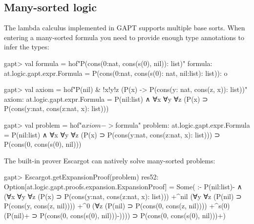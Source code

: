 \documentclass[a4paper,11pt]{article}
\begin{document}
\subsection{Many-sorted logic}\label{sec:many_sorted}

The lambda calculus implemented in GAPT supports multiple base sorts.  When
entering a many-sorted formula you need to provide enough type annotations to
infer the types:
\begin{clilisting}
gapt> val formula = hof"P(cons(0:nat, cons(s(0), nil)): list)"
formula: at.logic.gapt.expr.Formula = P(cons(0:nat, cons(s(0): nat, nil:list): list)): o

gapt> val axiom = hof"P(nil) & !x!y!z (P(x) -> P(cons(y: nat, cons(z, x)): list))"
axiom: at.logic.gapt.expr.Formula = P(nil:list) ∧ ∀x ∀y ∀z (P(x) ⊃ P(cons(y:nat, cons(z:nat, x): list)))

gapt> val problem = hof"$axiom -> $formula"
problem: at.logic.gapt.expr.Formula =
P(nil:list) ∧ ∀x ∀y ∀z (P(x) ⊃ P(cons(y:nat, cons(z:nat, x): list))) ⊃
  P(cons(0, cons(s(0), nil)))

\end{clilisting}

The built-in prover Escargot can natively solve many-sorted problems:
\begin{clilisting}
gapt> Escargot.getExpansionProof(problem)
res52: Option[at.logic.gapt.proofs.expansion.ExpansionProof] =
Some(
:-
P(nil:list)- ∧
    (∀x ∀y ∀z (P(x) ⊃ P(cons(y:nat, cons(z:nat, x): list)))
      +^{nil}
        (∀y ∀z (P(nil) ⊃ P(cons(y, cons(z, nil))))
          +^{0}
            (∀z (P(nil) ⊃ P(cons(0, cons(z, nil))))
              +^{s(0)} (P(nil)+ ⊃ P(cons(0, cons(s(0), nil)))-)))) ⊃
  P(cons(0, cons(s(0), nil)))+)

\end{clilisting}
\end{document}
